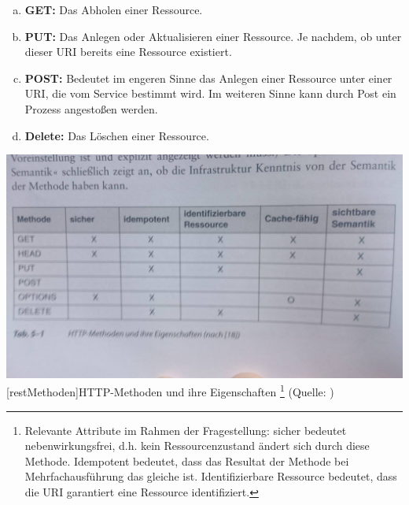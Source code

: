 \documentclass[12pt,a4paper,bibliography=totocnumbered,listof=totoc]{scrartcl}
\begin{document}
\begin{compactitem}
\begin{enumerate}[a.]
\item \textbf{GET:} Das Abholen einer Ressource.
\item \textbf{PUT:} Das Anlegen oder Aktualisieren einer Ressource. Je nachdem, ob unter dieser URI bereits eine Ressource existiert.
\item \textbf{POST:} Bedeutet im engeren Sinne das Anlegen einer Ressource unter einer URI, die vom Service bestimmt wird. Im weiteren Sinne kann durch Post ein Prozess angestoßen werden.
\item \textbf{Delete:} Das Löschen einer Ressource.
\end{enumerate}

\vspace{1em}
\begin{minipage}{\linewidth}
	\centering
	\includegraphics[width=0.7\linewidth]{Abbildungen/restMethoden.jpg}
	[restMethoden]{HTTP-Methoden und ihre Eigenschaften
	\footnote{Relevante Attribute im Rahmen der Fragestellung: \glqq sicher\grqq{} bedeutet nebenwirkungsfrei, d.h. kein Ressourcenzustand ändert sich durch diese Methode. \glqq Idempotent\grqq{} bedeutet, dass das Resultat der Methode bei Mehrfachausführung das gleiche ist. \glqq Identifizierbare Ressource\grqq{} bedeutet, dass die URI garantiert eine Ressource identifiziert.}
	(Quelle: \citet{tilkov11})}
	\label{fig:restMethoden}
\end{minipage}
\vspace{1em}


\end{compactitem}
\end{document}
